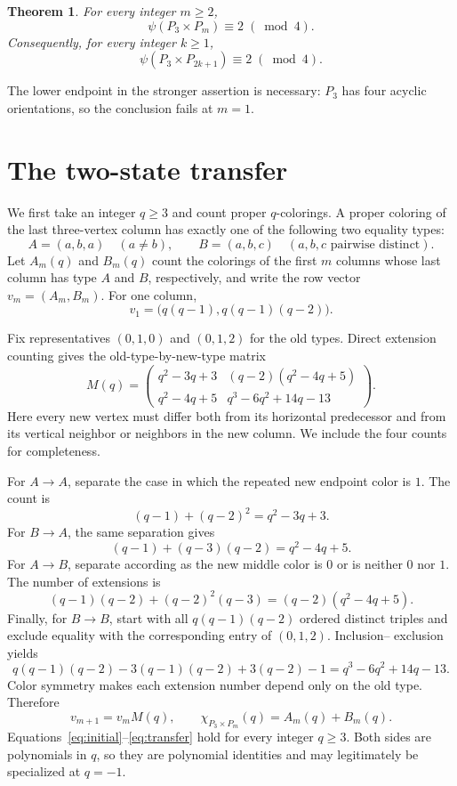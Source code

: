 \documentclass[11pt]{article}
\newtheorem{theorem}{Theorem}
\newcommand{\psia}{\psi}
\begin{document}
\begin{theorem}\label{thm:main}
For every integer $m\geq2$,
\[
  \psia(P_3\times P_m)\equiv2\;(\bmod 4).
\]
Consequently, for every integer $k\geq1$,
\[
  \psia(P_3\times P_{2k+1})\equiv2\;(\bmod 4).
\]
\end{theorem}

The lower endpoint in the stronger assertion is necessary: $P_3$ has four
acyclic orientations, so the conclusion fails at $m=1$.

\section{The two-state transfer}

We first take an integer $q\geq3$ and count proper $q$-colorings.  A proper
coloring of the last three-vertex column has exactly one of the following two
equality types:
\[
  A=(a,b,a)\quad(a\neq b),
  \qquad
  B=(a,b,c)\quad(a,b,c\text{ pairwise distinct}).
\]
Let $A_m(q)$ and $B_m(q)$ count the colorings of the first $m$ columns whose
last column has type $A$ and $B$, respectively, and write the row vector
$v_m=(A_m,B_m)$.  For one column,
\begin{equation}\label{eq:initial}
  v_1=\bigl(q(q-1),q(q-1)(q-2)\bigr).
\end{equation}

Fix representatives $(0,1,0)$ and $(0,1,2)$ for the old types.  Direct
extension counting gives the old-type-by-new-type matrix
\begin{equation}\label{eq:matrix}
M(q)=
\left(\begin{array}{cc}
q^2-3q+3 &(q-2)(q^2-4q+5)\\
q^2-4q+5&q^3-6q^2+14q-13
\end{array}\right).
\end{equation}
Here every new vertex must differ both from its horizontal predecessor and
from its vertical neighbor or neighbors in the new column.  We include the
four counts for completeness.

For $A\to A$, separate the case in which the repeated new endpoint color is
$1$.  The count is
\[
 (q-1)+(q-2)^2=q^2-3q+3.
\]
For $B\to A$, the same separation gives
\[
 (q-1)+(q-3)(q-2)=q^2-4q+5.
\]
For $A\to B$, separate according as the new middle color is $0$ or is neither
$0$ nor $1$.  The number of extensions is
\[
 (q-1)(q-2)+(q-2)^2(q-3)
   =(q-2)(q^2-4q+5).
\]
Finally, for $B\to B$, start with all $q(q-1)(q-2)$ ordered distinct triples
and exclude equality with the corresponding entry of $(0,1,2)$.  Inclusion--
exclusion yields
\[
 q(q-1)(q-2)-3(q-1)(q-2)+3(q-2)-1
 =q^3-6q^2+14q-13.
\]
Color symmetry makes each extension number depend only on the old type.
Therefore
\begin{equation}\label{eq:transfer}
  v_{m+1}=v_mM(q),
  \qquad
  \chi_{P_3\times P_m}(q)=A_m(q)+B_m(q).
\end{equation}
Equations~\eqref{eq:initial}--\eqref{eq:transfer} hold for every integer
$q\geq3$.  Both sides are polynomials in $q$, so they are polynomial
identities and may legitimately be specialized at $q=-1$.
\end{document}
